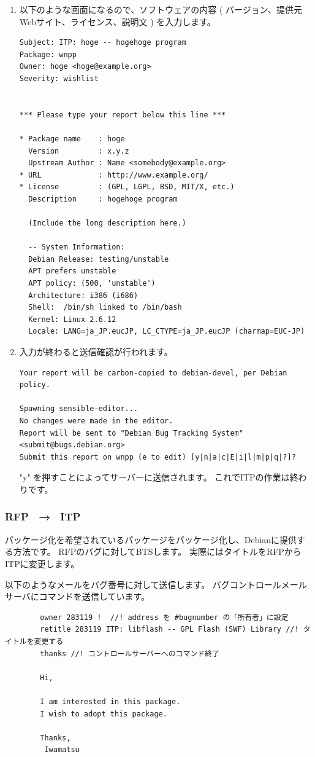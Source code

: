 \documentclass[mingoth,a4paper]{jsarticle}
\begin{document}
\begin{enumerate}
        \item 以下のような画面になるので、ソフトウェアの内容 ( バージョン、提供元Webサイト、ライセンス、説明文 ) を入力します。
		\begin{verbatim}
Subject: ITP: hoge -- hogehoge program
Package: wnpp
Owner: hoge <hoge@example.org>
Severity: wishlist


*** Please type your report below this line ***

* Package name    : hoge
  Version         : x.y.z
  Upstream Author : Name <somebody@example.org>
* URL             : http://www.example.org/
* License         : (GPL, LGPL, BSD, MIT/X, etc.)
  Description     : hogehoge program

  (Include the long description here.)

  -- System Information:
  Debian Release: testing/unstable
  APT prefers unstable
  APT policy: (500, 'unstable')
  Architecture: i386 (i686)
  Shell:  /bin/sh linked to /bin/bash
  Kernel: Linux 2.6.12
  Locale: LANG=ja_JP.eucJP, LC_CTYPE=ja_JP.eucJP (charmap=EUC-JP)
		\end{verbatim}

        \item 入力が終わると送信確認が行われます。
		\begin{verbatim}
Your report will be carbon-copied to debian-devel, per Debian policy.

Spawning sensible-editor...
No changes were made in the editor.
Report will be sent to "Debian Bug Tracking System" <submit@bugs.debian.org>
Submit this report on wnpp (e to edit) [y|n|a|c|E|i|l|m|p|q|?]?

			\end{verbatim}
            "y" を押すことによってサーバーに送信されます。
            これでITPの作業は終わりです。
		\end{enumerate}
    \subsubsection{ RFP　→　ITP }
        パッケージ化を希望されているパッケージをパッケージ化し、Debianに提供する方法です。
        RFPのバグに対してBTSします。
        実際にはタイトルをRFPからITPに変更します。

		以下のようなメールをバグ番号に対して送信します。
		バグコントロールメールサーバにコマンドを送信しています。
		
		\begin{verbatim}
        owner 283119 !	//! address を #bugnumber の「所有者」に設定
        retitle 283119 ITP: libflash -- GPL Flash (SWF) Library //! タイトルを変更する
        thanks //! コントロールサーバーへのコマンド終了

        Hi,

        I am interested in this package.
        I wish to adopt this package.

        Thanks,
         Iwamatsu
		\end{verbatim}
\end{document}
